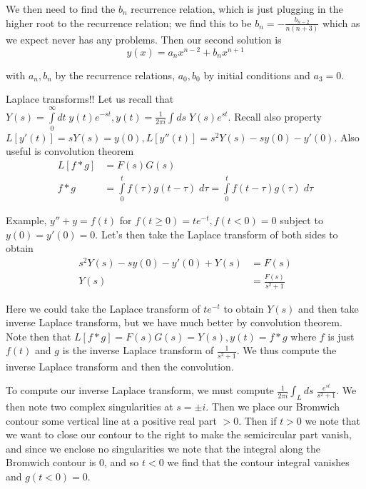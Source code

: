 \documentclass[10pt]{report}
\begin{document}
We then need to find the $b_n$ recurrence relation, which is just plugging in the higher root to the recurrence relation; we find this to be $b_n = -\frac{b_{n-2}}{n(n+3)}$ which as we expect never has any problems. Then our second solution is
\begin{equation}
    y(x) = a_n x^{n-2} + b_n x^{n+1}
\end{equation}

with $a_n, b_n$ by the recurrence relations, $a_0, b_0$ by initial conditions and $a_3 = 0$. 

Laplace transforms!! Let us recall that $Y(s) = \displaystyle\int\limits_{0}^{\infty}dt\;y(t) e^{-st}, y(t) = \frac{1}{2\pi i}\int ds\; Y(s)e^{st}$. Recall also property $L[y'(t)] = sY(s) = y(0), L[y''(t)] = s^2 Y(s) - sy(0) - y'(0)$. Also useful is convolution theorem
\begin{align}
    L[f*g] &= F(s)G(s)\\
    f*g &= \displaystyle\int\limits_{0}^{t}f(\tau)g(t-\tau) \; d\tau = \displaystyle\int\limits_{0}^{t}f(t-\tau)g(\tau)\;d\tau
\end{align}

Example, $y'' + y = f(t)$ for $f(t \geq 0) = te^{-t}, f(t < 0) = 0$ subject to $y(0) = y'(0) = 0$. Let's then take the Laplace transform of both sides to obtain
\begin{align}
    s^2 Y(s) - sy(0) - y'(0) + Y(s) &= F(s)\\
    Y(s) &= \frac{F(s)}{s^2 + 1}
\end{align}

Here we could take the Laplace transform of $te^{-t}$ to obtain $Y(s)$ and then take inverse Laplace transform, but we have much better by convolution theorem. Note then that $L[f*g] = F(s)G(s) = Y(s), y(t) = f * g$ where $f$ is just $f(t)$ and $g$ is the inverse Laplace transform of $\frac{1}{s^2 + 1}$. We thus compute the inverse Laplace transform and then the convolution.

To compute our inverse Laplace transform, we must compute $\frac{1}{2\pi i}\int_L ds \; \frac{e^{st}}{s^2 + 1}$. We then note two complex singularities at $s = \pm i$. Then we place our Bromwich contour some vertical line at a positive real part $> 0$. Then if $t > 0$ we note that we want to close our contour to the right to make the semicircular part vanish, and since we enclose no singularities we note that the integral along the Bromwich contour is $0$, and so $t < 0$ we find that the contour integral vanishes and $g(t < 0) = 0$.
\end{document}
